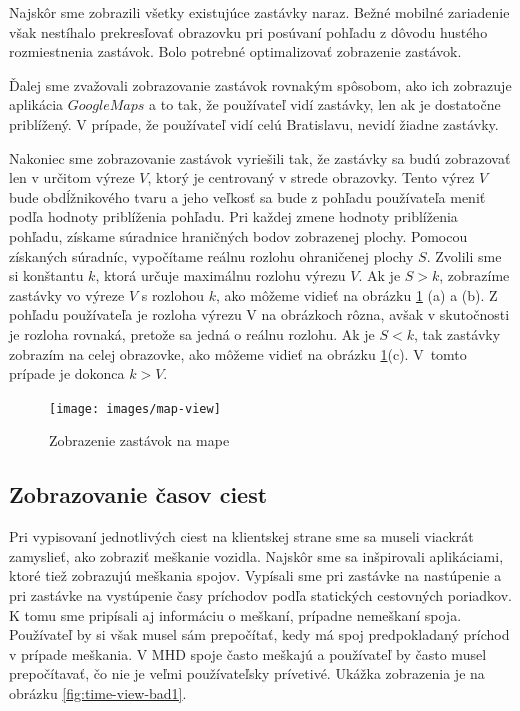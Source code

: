 Najskôr sme zobrazili všetky existujúce zastávky naraz. Bežné mobilné zariadenie však nestíhalo prekresľovať obrazovku pri posúvaní pohľadu z dôvodu hustého rozmiestnenia zastávok. Bolo potrebné optimalizovať zobrazenie zastávok. 

Ďalej sme zvažovali zobrazovanie zastávok rovnakým spôsobom, ako ich zobrazuje aplikácia $Google Maps$ a to tak, že používateľ vidí zastávky, len ak je dostatočne priblížený. V prípade, že používateľ vidí celú Bratislavu, nevidí žiadne zastávky. 

Nakoniec sme zobrazovanie zastávok vyriešili tak, že zastávky sa budú zobrazovať len v určitom výreze $V$, ktorý je centrovaný v strede obrazovky. Tento výrez $V$ bude obdĺžnikového tvaru a jeho veľkosť sa bude z pohľadu používateľa meniť podľa hodnoty priblíženia pohľadu. 
Pri každej zmene hodnoty priblíženia pohľadu, získame súradnice hraničných bodov zobrazenej plochy. Pomocou získaných súradníc, vypočítame reálnu rozlohu ohraničenej plochy $S$. Zvolili sme si konštantu $k$, ktorá určuje maximálnu rozlohu výrezu $V$. 
Ak je $S > k$, zobrazíme zastávky vo výreze $V$ s rozlohou $k$, ako môžeme vidieť na obrázku \ref{fig:map-view} (a) a (b). Z pohľadu používateľa je rozloha výrezu V na obrázkoch rôzna, avšak v skutočnosti je rozloha rovnaká, pretože sa jedná o reálnu rozlohu.
Ak je $S < k$, tak zastávky zobrazím na celej obrazovke, ako môžeme vidieť na obrázku \ref{fig:map-view}(c). V~tomto prípade je dokonca $k > V$.

\begin{figure}[H]
\centerline{\texttt{[image: images/map-view]}}
\caption[Zobrazenie zastávok na mape]{Zobrazenie zastávok na mape}
\label{fig:map-view}
\end{figure}

\subsection{Zobrazovanie časov ciest}
Pri vypisovaní jednotlivých ciest na klientskej strane sme sa museli viackrát zamyslieť, ako zobraziť meškanie vozidla. Najskôr sme sa inšpirovali aplikáciami, ktoré tiež zobrazujú meškania spojov. Vypísali sme pri zastávke na nastúpenie a pri zastávke na vystúpenie časy príchodov podľa statických cestovných poriadkov. K tomu sme pripísali aj informáciu o meškaní, prípadne nemeškaní spoja. Používateľ by si však musel sám prepočítať, kedy má spoj predpokladaný príchod v prípade meškania. V MHD spoje často meškajú a používateľ by často musel prepočítavať, čo nie je veľmi používateľsky prívetivé. Ukážka zobrazenia je na obrázku \ref{fig:time-view-bad1}.

